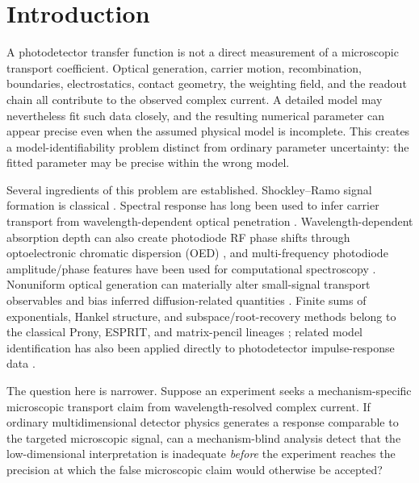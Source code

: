 \documentclass[11pt]{article}
\begin{document}
\section{Introduction}

A photodetector transfer function is not a direct measurement of a microscopic transport coefficient. Optical generation, carrier motion, recombination, boundaries, electrostatics, contact geometry, the weighting field, and the readout chain all contribute to the observed complex current. A detailed model may nevertheless fit such data closely, and the resulting numerical parameter can appear precise even when the assumed physical model is incomplete. This creates a model-identifiability problem distinct from ordinary parameter uncertainty: the fitted parameter may be precise within the wrong model.

Several ingredients of this problem are established. Shockley--Ramo signal formation is classical \cite{Shockley1938,Ramo1939,Dabrowski1989}. Spectral response has long been used to infer carrier transport from wavelength-dependent optical penetration \cite{Goodman1961,Geist1980}. Wavelength-dependent absorption depth can also create photodiode RF phase shifts through optoelectronic chromatic dispersion (OED) \cite{Glasser2021,Liokumovitch2021,Dutta2024}, and multi-frequency photodiode amplitude/phase features have been used for computational spectroscopy \cite{Kassa2026}. Nonuniform optical generation can materially alter small-signal transport observables and bias inferred diffusion-related quantities \cite{Halme2008}. Finite sums of exponentials, Hankel structure, and subspace/root-recovery methods belong to the classical Prony, ESPRIT, and matrix-pencil lineages \cite{Prony1795,RoyKailath1989,HuaSarkar1990}; related model identification has also been applied directly to photodetector impulse-response data \cite{Sun2025}.

The question here is narrower. Suppose an experiment seeks a mechanism-specific microscopic transport claim from wavelength-resolved complex current. If ordinary multidimensional detector physics generates a response comparable to the targeted microscopic signal, can a mechanism-blind analysis detect that the low-dimensional interpretation is inadequate \emph{before} the experiment reaches the precision at which the false microscopic claim would otherwise be accepted?
\end{document}
